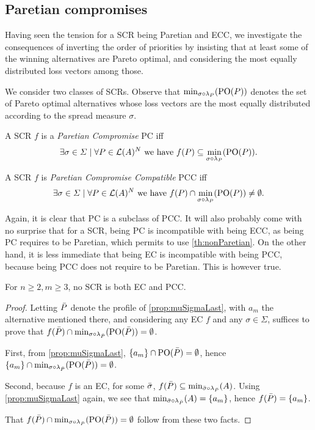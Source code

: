 \documentclass[version=3.21, pagesize, twoside=off, bibliography=totoc, DIV=calc, fontsize=12pt, a4paper]{scrartcl}
\begin{document}
\subsection{Paretian compromises}
Having seen the tension for a SCR being Paretian and ECC, we investigate the consequences of inverting the order of priorities by insisting that at least some of the winning alternatives are Pareto optimal, and considering the most equally distributed loss vectors among those.

We consider two classes of SCRs. 
Observe that $\mustar$ denotes the set of Pareto optimal alternatives whose loss vectors are the most equally distributed according to the spread measure $\sigma$.

\begin{definition} A SCR $f$ is a \emph{Paretian Compromise} PC iff \[\exists \sigma \in \Sigma \suchthat \forall P \in \linors^N \text{ we have } f(P) \subseteq \mustar.\]
\end{definition}

\begin{definition} A SCR $f$ is \emph{Paretian Compromise Compatible} PCC iff \[\exists \sigma \in \Sigma \suchthat \forall P \in \linors^N \text{ we have } f(P) \cap \mustar \neq \emptyset.\]
\end{definition}

Again, it is clear that PC is a subclass of PCC. It will also probably come with no surprise that for a SCR, being PC is incompatible with being ECC, as being PC requires to be Paretian, which permits to use \cref{th:nonParetian}. On the other hand, it is less immediate that being EC is incompatible with
being PCC, because being PCC does not require to be Paretian. This is however true.

\begin{theorem} \label{th:incompatibility} 
	For $n ≥ 2, m ≥ 3$, no SCR is both EC and PCC.
\end{theorem}
\begin{proof}	
	Letting $\bar{P}$ denote the profile of \cref{prop:muSigmaLast}, with $a_m$ the alternative mentioned there, and considering any EC $f$ and any $\sigma \in \Sigma$, suffices to prove that $f(\Ptop) \cap {\mustar[\sigma][\Ptop]} = \emptyset$.
	
	First, from \cref{prop:muSigmaLast}, $\{a_m\} \cap \text{PO}(\bar{P}) = \emptyset$, hence $\set{a_m} \cap {\mustar[\sigma][\Ptop]} = \emptyset$. 
	
	Second, because $f$ is an EC, for some $\bar{\sigma}$, $f(\Ptop) \subseteq {\musigma[\sigmatop][\Ptop]}$. Using \cref{prop:muSigmaLast} again, we see that ${\musigma[\sigmatop][\Ptop]} = \set{a_m}$, hence $f(\bar{P}) = \{a_m\}$.
	
	That $f(\Ptop) \cap {\mustar[\sigma][\Ptop]} = \emptyset$ follow from these two facts.
\end{proof}
\end{document}

